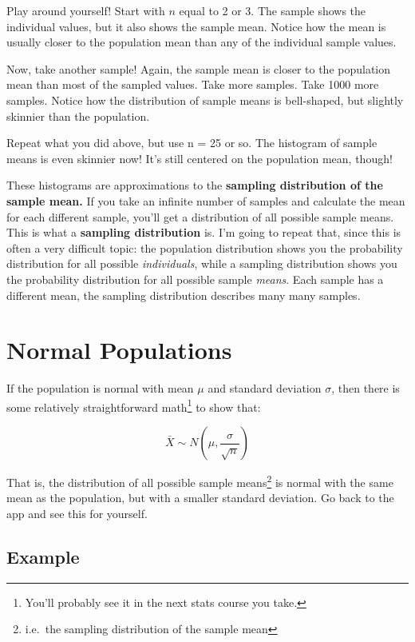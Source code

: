 \documentclass[
  letterpaper,
  DIV=11,
  numbers=noendperiod]{scrreprt}
\begin{document}
Play around yourself! Start with \(n\) equal to 2 or 3. The sample shows
the individual values, but it also shows the sample mean. Notice how the
mean is usually closer to the population mean than any of the individual
sample values.

Now, take another sample! Again, the sample mean is closer to the
population mean than most of the sampled values. Take more samples. Take
1000 more samples. Notice how the distribution of sample means is
bell-shaped, but slightly skinnier than the population.

Repeat what you did above, but use n = 25 or so. The histogram of sample
means is even skinnier now! It's still centered on the population mean,
though!

These histograms are approximations to the \textbf{sampling distribution
of the sample mean.} If you take an infinite number of samples and
calculate the mean for each different sample, you'll get a distribution
of all possible sample means. This is what a \textbf{sampling
distribution} is. I'm going to repeat that, since this is often a very
difficult topic: the population distribution shows you the probability
distribution for all possible \emph{individuals}, while a sampling
distribution shows you the probability distribution for all possible
sample \emph{means}. Each sample has a different mean, the sampling
distribution describes many many samples.

\hypertarget{normal-populations}{%
\section{Normal Populations}\label{normal-populations}}

If the population is normal with mean \(\mu\) and standard deviation
\(\sigma\), then there is some relatively straightforward
math\footnote{You'll probably see it in the next stats course you take.}
to show that:

\[
\bar X \sim N\left(\mu, \frac{\sigma}{\sqrt{n}}\right)
\]

That is, the distribution of all possible sample means\footnote{i.e.~the
  sampling distribution of the sample mean} is normal with the same mean
as the population, but with a smaller standard deviation. Go back to the
app and see this for yourself.

\hypertarget{example-1}{%
\subsection{Example}\label{example-1}}
\end{document}
